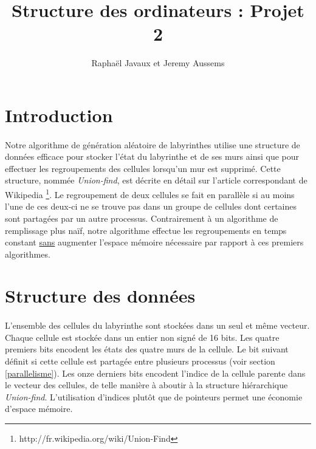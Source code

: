 \documentclass[a4paper,french]{article}
\title{Structure des ordinateurs : Projet 2}
\author{Raphaël Javaux et Jeremy Aussems}
\date{}
\begin{document}
\maketitle

\section{Introduction}

    \paragraph{} Notre algorithme de génération aléatoire de labyrinthes utilise
une structure de données efficace pour stocker l'état du labyrinthe et de ses
murs ainsi que pour effectuer les regroupements des cellules lorsqu'un mur est
supprimé.
    \newline Cette structure, nommée \textit{Union-find}, est décrite en détail
sur l'article correspondant de Wikipedia
\footnote{http://fr.wikipedia.org/wiki/Union-Find}. Le regroupement de deux
cellules se fait en parallèle si au moins l'une de ces deux-ci ne se trouve pas
dans un groupe de cellules dont certaines sont partagées par un autre processus.
    \newline Contrairement à un algorithme de remplissage plus naïf, notre
algorithme effectue les regroupements en temps constant \underline{sans}
augmenter l'espace mémoire nécessaire par rapport à ces premiers algorithmes.

\section{Structure des données}
\label{donnees}

    \paragraph{} L'ensemble des cellules du labyrinthe sont stockées dans un
seul et même vecteur.
    \newline Chaque cellule est stockée dans un entier non signé de 16 bits. Les
quatre premiers bits encodent les états des quatre murs de la cellule. Le bit
suivant définit si cette cellule est partagée entre plusieurs processus (voir
section \ref{parallelisme}). Les onze derniers bits encodent l'indice de la
cellule parente dans le vecteur des cellules, de telle manière à aboutir à la
structure hiérarchique \textit{Union-find}. L'utilisation d'indices plutôt que
de pointeurs permet une économie d'espace mémoire.
\end{document}

